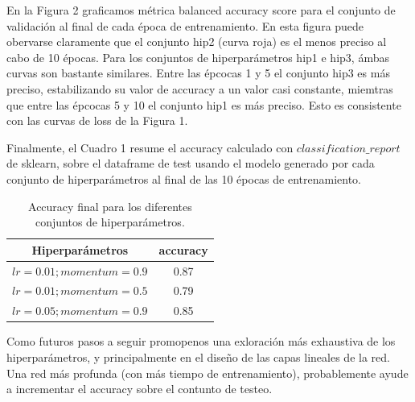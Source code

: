 \documentclass[a4paper,10pt]{article}
\begin{document}
En la Figura 2 graficamos métrica balanced accuracy score para el conjunto de validación al final de cada época de entrenamiento. En esta figura puede obervarse claramente que el conjunto hip2 (curva roja) es el menos preciso al cabo de 10 épocas. Para los conjuntos de hiperparámetros hip1 e hip3, ámbas curvas son bastante similares. Entre las épcocas 
1 y 5 el conjunto hip3 es más preciso, estabilizando su valor de accuracy a un valor casi constante, miemtras que entre las épcocas 5 y 10 el conjunto hip1 es más preciso. Esto es consistente con las curvas de loss de la Figura 1.

Finalmente, el Cuadro 1 resume el accuracy calculado con $classification\_report$ de sklearn, sobre el dataframe de test usando el modelo generado por cada conjunto de hiperparámetros al final de las 10 épocas de entrenamiento.
\begin{table}[h]
\caption{Accuracy final para los diferentes conjuntos de hiperparámetros.}\label{tab:data}
\begin{tabular}{cc}
\hline
Hiperparámetros  & accuracy \\
\hline
\hline
$lr=0.01; momentum=0.9$ &  0.87\\
$lr=0.01; momentum=0.5$ &  0.79\\
$lr=0.05; momentum=0.9$ &  0.85
\end{tabular}
\end{table}

Como futuros pasos a seguir promopenos una exloración más exhaustiva de los hiperparámetros, y principalmente en el diseño de las capas lineales de la red. Una red más profunda (con más tiempo de entrenamiento), probablemente ayude a incrementar el accuracy sobre el contunto de testeo.
\end{document}
